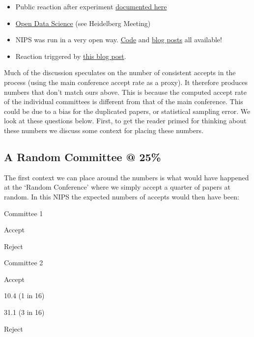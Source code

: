 \begin{itemize}
\item
  Public reaction after experiment
  \href{http://inverseprobability.com/2015/01/16/blogs-on-the-nips-experiment/}{documented
  here}
\item
  \href{http://inverseprobability.com/2014/07/01/open-data-science/}{Open
  Data Science} (see Heidelberg Meeting)
\item
  NIPS was run in a very open way.
  \href{https://github.com/sods/conference}{Code} and
  \href{http://inverseprobability.com/2014/12/16/the-nips-experiment/}{blog
  posts} all available!
\item
  Reaction triggered by
  \href{http://blog.mrtz.org/2014/12/15/the-nips-experiment.html}{this
  blog post}.
\end{itemize}

Much of the discussion speculates on the number of consistent accepts in
the process (using the main conference accept rate as a proxy). It
therefore produces numbers that don't match ours above. This is because
the computed accept rate of the individual committees is different from
that of the main conference. This could be due to a bias for the
duplicated papers, or statistical sampling error. We look at these
questions below. First, to get the reader primed for thinking about
these numbers we discuss some context for placing these numbers.

\hypertarget{a-random-committee-25}{%
\subsection{A Random Committee @ 25\%}\label{a-random-committee-25}}

\begin{flushright}
\end{flushright}

The first context we can place around the numbers is what would have
happened at the `Random Conference' where we simply accept a quarter of
papers at random. In this NIPS the expected numbers of accepts would
then have been:

Committee 1

Accept

Reject

Committee 2

Accept

10.4 (1 in 16)

31.1 (3 in 16)

Reject

